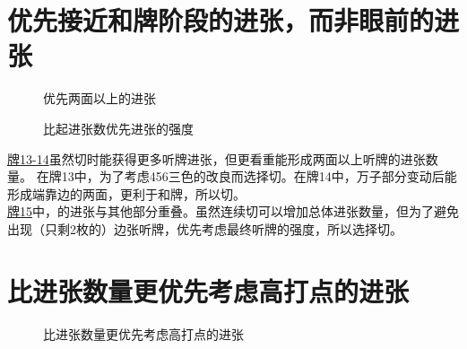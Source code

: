 \section{优先接近和牌阶段的进张，而非眼前的进张}
\begin{figure}
    \caption{优先两面以上的进张}
    \label{lec6:pai13-14}
    \par\bigskip
\end{figure}
\begin{figure}
    \caption{比起进张数优先进张的强度}
    \label{lec6:pai15}
\end{figure}
\hyperlink{lec6:pai13-14}{牌13-14}虽然切时能获得更多听牌进张，但更看重能形成两面以上听牌的进张数量。
在牌13中，为了考虑456三色的改良而选择切。在牌14中，万子部分变动后能形成端靠边的两面，更利于和牌，所以切。\\
\hyperlink{lec6:pai15}{牌15}中，的进张与其他部分重叠。虽然连续切可以增加总体进张数量，但为了避免出现（只剩2枚的）边张听牌，优先考虑最终听牌的强度，所以选择切。

\section{比进张数量更优先考虑高打点的进张}
\begin{figure}[h]
    \caption{比进张数量更优先考虑高打点的进张}
    \label{lec6:pai16-21}
    \par\bigskip
    \par\bigskip
    \par\bigskip
    \par\bigskip
    \par\bigskip
\end{figure}

